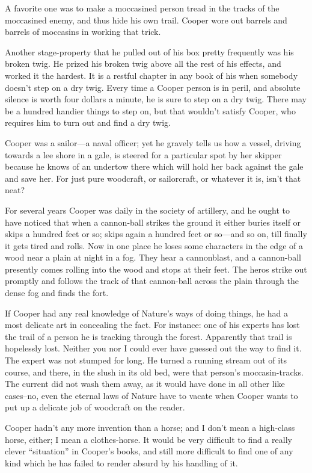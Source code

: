 \documentclass{novelette}
\begin{document}
A favorite one was to make a moccasined person tread
in the tracks of the moccasined enemy, and thus hide his own trail.
Cooper wore out barrels and barrels of moccasins in working that trick.

Another stage-property that he pulled out of his box pretty frequently
was his broken twig. He prized his broken twig above all the rest of his
effects, and worked it the hardest. It is a restful chapter in any book
of his when somebody doesn't step on a dry twig. Every time a Cooper person is
in peril, and absolute silence is worth four dollars a minute, he is
sure to step on a dry twig. There may be a hundred handier things to
step on, but that wouldn't satisfy Cooper, who requires him to turn
out and find a dry twig.

Cooper was a sailor---a naval officer; yet he gravely tells us how
a vessel, driving towards a lee shore in a gale, is steered for a
particular spot by her skipper because he knows of an undertow there
which will hold her back against the gale and save her. For just pure
woodcraft, or sailorcraft, or whatever it is, isn't that neat?

For several years Cooper was daily in the society of artillery, and he ought
to have noticed that when a cannon-ball strikes the ground it either
buries itself or skips a hundred feet or so; skips again a hundred feet
or so---and so on, till finally it gets tired and rolls. Now in one place
he loses some characters in the edge of a wood
near a plain at night in a fog. They hear a cannonblast, and a
cannon-ball presently comes rolling into the wood and stops at their
feet. The heros strike out promptly and follows the track of that cannon-ball
across the plain through the dense fog and finds the fort.

If Cooper had any real knowledge of Nature's ways of doing
things, he had a most delicate art in concealing the fact. For instance:
one of his experts has lost the trail of a person he is tracking through the
forest. Apparently that trail is hopelessly lost. Neither you nor I
could ever have guessed out the way to find it. The expert was not stumped
for long. He turned a running
stream out of its course, and there, in the slush in its old bed, were
that person's moccasin-tracks. The current did not wash them away, as
it would have done in all other like cases--no, even the eternal laws
of Nature have to vacate when Cooper wants to put up a delicate job of
woodcraft on the reader.

Cooper hadn't any more invention than a horse; and I don't mean a
high-class horse, either; I mean a clothes-horse. It would be very
difficult to find a really clever “situation” in Cooper's books, and
still more difficult to find one of any kind which he has failed to
render absurd by his handling of it.
\end{document}
